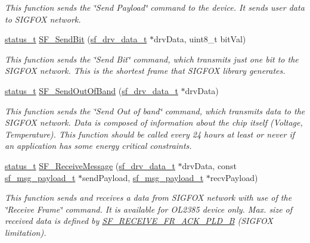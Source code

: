 \begin{DoxyCompactItemize}
\begin{DoxyCompactList}\small\item\em This function sends the \char`\"{}\+Send Payload\char`\"{} command to the device. It sends user data to S\+I\+G\+F\+OX network. \end{DoxyCompactList}\item 
\mbox{\hyperlink{group__ksdk__common_gaaabdaf7ee58ca7269bd4bf24efcde092}{status\+\_\+t}} \mbox{\hyperlink{group__sf__functions__group_ga2aab15da7a9994b53fe66dfe5c8f85a5}{S\+F\+\_\+\+Send\+Bit}} (\mbox{\hyperlink{structsf__drv__data__t}{sf\+\_\+drv\+\_\+data\+\_\+t}} $\ast$drv\+Data, uint8\+\_\+t bit\+Val)
\begin{DoxyCompactList}\small\item\em This function sends the \char`\"{}\+Send Bit\char`\"{} command, which transmits just one bit to the S\+I\+G\+F\+OX network. This is the shortest frame that S\+I\+G\+F\+OX library generates. \end{DoxyCompactList}\item 
\mbox{\hyperlink{group__ksdk__common_gaaabdaf7ee58ca7269bd4bf24efcde092}{status\+\_\+t}} \mbox{\hyperlink{group__sf__functions__group_gaf898f1fe312b1d8f9156b18249211b83}{S\+F\+\_\+\+Send\+Out\+Of\+Band}} (\mbox{\hyperlink{structsf__drv__data__t}{sf\+\_\+drv\+\_\+data\+\_\+t}} $\ast$drv\+Data)
\begin{DoxyCompactList}\small\item\em This function sends the \char`\"{}\+Send Out of band\char`\"{} command, which transmits data to the S\+I\+G\+F\+OX network. Data is composed of information about the chip itself (Voltage, Temperature). This function should be called every 24 hours at least or never if an application has some energy critical constraints. \end{DoxyCompactList}\item 
\mbox{\hyperlink{group__ksdk__common_gaaabdaf7ee58ca7269bd4bf24efcde092}{status\+\_\+t}} \mbox{\hyperlink{group__sf__functions__group_ga9489fa1c9163a0d028a508d81718274b}{S\+F\+\_\+\+Receive\+Message}} (\mbox{\hyperlink{structsf__drv__data__t}{sf\+\_\+drv\+\_\+data\+\_\+t}} $\ast$drv\+Data, const \mbox{\hyperlink{structsf__msg__payload__t}{sf\+\_\+msg\+\_\+payload\+\_\+t}} $\ast$send\+Payload, \mbox{\hyperlink{structsf__msg__payload__t}{sf\+\_\+msg\+\_\+payload\+\_\+t}} $\ast$recv\+Payload)
\begin{DoxyCompactList}\small\item\em This function sends and receives a data from S\+I\+G\+F\+OX network with use of the \char`\"{}\+Receive Frame\char`\"{} command. It is available for O\+L2385 device only. Max. size of received data is defined by \mbox{\hyperlink{sf__ol23xx_8h_aca8e44f5d34123c5d83bafdf690358f7}{S\+F\+\_\+\+R\+E\+C\+E\+I\+V\+E\+\_\+\+F\+R\+\_\+\+A\+C\+K\+\_\+\+P\+L\+D\+\_\+B}} (S\+I\+G\+F\+OX limitation). \end{DoxyCompactList}\item 

\end{DoxyCompactItemize}
